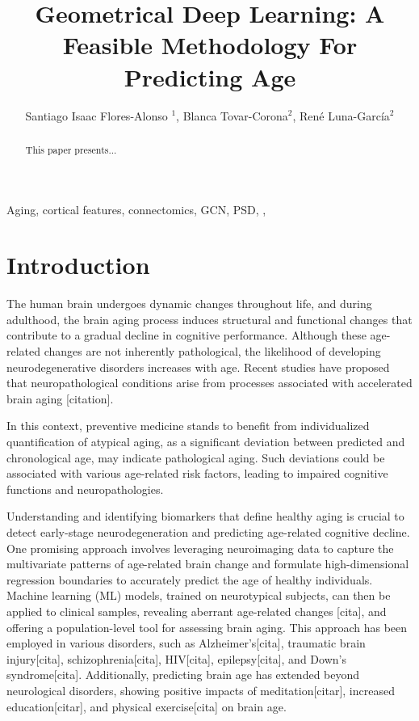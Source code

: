 \documentclass{cys}
\title{Geometrical Deep Learning: A Feasible Methodology For Predicting Age}
\author{Santiago Isaac Flores-Alonso $^1$, Blanca Tovar-Corona$^2$, René Luna-García$^2$}
\affil{ 
$^1$ IPN,CIC, Ciudad de México 07738,   \authorcr   %
México            
\authorcr \authorcr
$^2$ IPN,UPIITA, Ciudad de México 07340, \authorcr
México             
\authorcr  \authorcr

$^3$ IPN,CIC, Ciudad de México 07738,   \authorcr   %
México                       
\authorcr  \authorcr
sfloresa2010@alumno.ipn.mx, bltovar@ipn.mx, rlunag@ipn.mx
\authorcr  \authorcr
}
\begin{document}
\maketitle

\renewcommand{\tablename}{Table}

\begin{abstract}
This paper presents...
\end{abstract}

\begin{keywords} 
Aging, cortical features, connectomics, GCN, PSD, , 
\end{keywords} 



\section{Introduction}
\label{sec:introduction}



The human brain undergoes dynamic changes throughout life, and during adulthood, the brain aging process induces structural and functional changes that contribute to a gradual decline in cognitive performance. Although these age-related changes are not inherently pathological, the likelihood of developing neurodegenerative disorders increases with age. Recent studies have proposed that neuropathological conditions arise from processes associated with accelerated brain aging [citation].

\bigskip In this context, preventive medicine stands to benefit from individualized quantification of atypical aging, as a significant deviation between predicted and chronological age, may indicate pathological aging. Such deviations could be associated with various age-related risk factors, leading to impaired cognitive functions and neuropathologies.

\bigskip
Understanding and identifying biomarkers that define healthy aging is crucial to detect early-stage neurodegeneration and predicting age-related cognitive decline. One promising approach involves leveraging neuroimaging data to capture the multivariate patterns of age-related brain change and formulate high-dimensional regression boundaries to accurately predict the age of healthy individuals. Machine learning (ML) models, trained on neurotypical subjects, can then be applied to clinical samples, revealing aberrant age-related changes [cita], and offering a population-level tool for assessing brain aging. This approach has been employed in various disorders, such as Alzheimer’s[cita], traumatic brain injury[cita], schizophrenia[cita], HIV[cita], epilepsy[cita], and Down’s syndrome[cita]. Additionally, predicting brain age has extended beyond neurological disorders, showing positive impacts of meditation[citar], increased education[citar], and physical exercise[cita] on brain age. 
\end{document}
